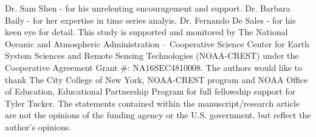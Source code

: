 \documentclass{sdsu-thesis}
\theoremstyle{dtm}
\begin{document}
\renewcommand*{\glsclearpage}{}
\begin{glossarypage}
  \centering
  \glsaddall\printglossary
\end{glossarypage}

\begin{acknowledgments}
Dr. Sam Shen - for his unrelenting encouragement and support.
Dr. Barbara Baily - for her expertise in time series analyis.
Dr. Fernando De Sales - for his keen eye for detail.
This study is supported and monitored by The National Oceanic and Atmospheric Administration – Cooperative Science Center for Earth System Sciences and Remote Sensing Technologies (NOAA-CREST) under the Cooperative Agreement Grant \#: NA16SEC4810008. The authors would like to thank The City College of New York, NOAA-CREST program and NOAA Office of Education, Educational Partnership Program for full fellowship support for Tyler Tucker. The statements contained within the manuscript/research article are not the opinions of the funding agency or the U.S. government, but reflect the author’s opinions.
\end{acknowledgments}
%
%
% 
% 






% 
% 
% 



% 
% 
% 
\end{document}
